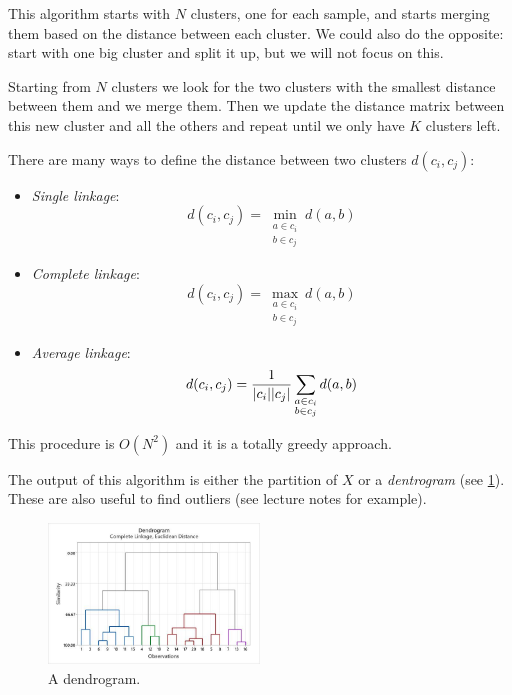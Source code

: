 \documentclass[12pt]{extarticle}
\begin{document}
This algorithm starts with $N$ clusters, one for each sample, and starts merging them based on the
distance between each cluster.
We could also do the opposite: start with one big cluster and split it up, but we will not focus on
this.

Starting from $N$ clusters we look for the two clusters with the smallest distance between them and
we merge them. Then we update the distance matrix between this new cluster and all the others and
repeat until we only have $K$ clusters left.

There are many ways to define the distance between two clusters $d(c_i, c_j)$:
\begin{itemize}
	\item \emph{Single linkage}:
	      \begin{equation}
		      d(c_i, c_j) = \min_{\substack{a \in c_i \\ b \in c_j}} d(a, b)
	      \end{equation}

	\item \emph{Complete linkage}:
	      \begin{equation}
		      d(c_i, c_j) = \max_{\substack{a \in c_i \\ b \in c_j}} d(a, b)
	      \end{equation}

	\item \emph{Average linkage}:
	      \begin{equation}
		      d(c_i, c_j) = \frac{1}{\abs{c_i} \abs{c_j}}
		      \sum_{\substack{a \in c_i \\ b \in c_j}} d(a, b)
	      \end{equation}
\end{itemize}

This procedure is $O(N^2)$ and it is a totally greedy approach.

The output of this algorithm is either the partition of $X$ or a \emph{dentrogram} (see
\cref{fig:dendrogram}).
These are also useful to find outliers (see lecture notes for example).

\begin{figure}[ht!]
	\centering
	\includegraphics[width=0.5\textwidth]{./assets/modelling-ml/dendrogram.png}
	\caption{A dendrogram.}
	\label{fig:dendrogram}
\end{figure}
\end{document}

